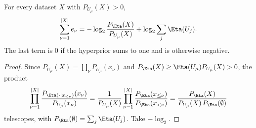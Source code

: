 \begin{lemma}
\label{lem:hsi-chain-rule}
For every dataset $X$ with $P_{U_\mu}(X)>0$,
\begin{equation}
\label{eq:hsi-chain-rule}
    \sum_{\nu=1}^{|X|} e_\nu
    = -\log_2\frac{P_\Eta(X)}{P_{U_\mu}(X)} + \log_2\sum_j\Eta(U_j).
\end{equation}
The last term is $0$ if the hyperprior sums to one and is otherwise negative.
\end{lemma}
\begin{proof}
Since $P_{U_\mu}(X)=\prod_\nu P_{U_\mu}(x_\nu)$ and $P_\Eta(X)\ge\Eta(U_\mu)P_{U_\mu}(X)>0$, the product
\[
    \prod_{\nu=1}^{|X|}\frac{P_{\Eta(\cdot\mid x_{<\nu})}(x_\nu)}{P_{U_\mu}(x_\nu)}
    =\frac{1}{P_{U_\mu}(X)}\prod_{\nu=1}^{|X|}\frac{P_\Eta(x_{\le\nu})}{P_\Eta(x_{<\nu})}
    =\frac{P_\Eta(X)}{P_{U_\mu}(X)\,P_\Eta(\emptyset)}
\]
telescopes, with $P_\Eta(\emptyset)=\sum_j\Eta(U_j)$. Take $-\log_2$.
\end{proof}

